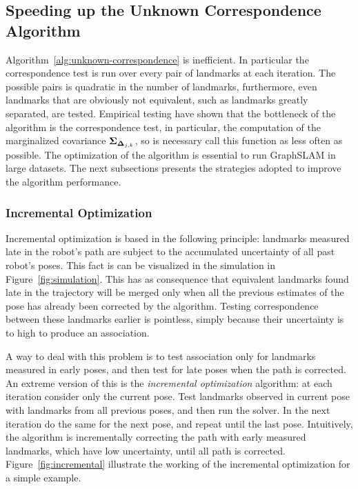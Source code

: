 \subsection{Speeding up the Unknown Correspondence Algorithm}

Algorithm~\ref{alg:unknown-correspondence} is inefficient. In particular the correspondence test is run over every pair of landmarks at each iteration. The possible pairs is quadratic in the number of landmarks, furthermore, even landmarks that are obviously not equivalent, such as landmarks greatly separated, are tested. Empirical testing have shown that the bottleneck of the algorithm is the correspondence test, in particular, the computation of the marginalized covariance $\boldsymbol{\Sigma}_{\boldsymbol{\Delta}_{j,k}}$, so is necessary call this function as less often as possible. The optimization of the algorithm is essential to run GraphSLAM in large datasets. The next subsections presents the strategies adopted to improve the algorithm performance.

\subsubsection{Incremental Optimization}

Incremental optimization is based in the following principle: landmarks measured late in the robot's path are subject to the accumulated uncertainty of all past robot's poses. This fact is can be visualized in the simulation in Figure~\ref{fig:simulation}. This has as consequence that equivalent landmarks found late in the trajectory will be merged only when all the previous estimates of the pose has already been corrected by the algorithm. Testing correspondence between these landmarks earlier is pointless, simply because their uncertainty is to high to produce an association. 

A way to deal with this problem is to test association only for landmarks measured in early poses, and then test for late poses when the path is corrected. An extreme version of this is the \emph{incremental optimization} algorithm: at each iteration consider only the current pose. Test landmarks observed in current pose with landmarks from all previous poses, and then run the solver. In the next iteration do the same for the next pose, and repeat until the last pose. Intuitively, the algorithm is incrementally correcting the path with early measured landmarks, which have low uncertainty, until all path is corrected. Figure~\ref{fig:incremental} illustrate the working of the incremental optimization for a simple example.

